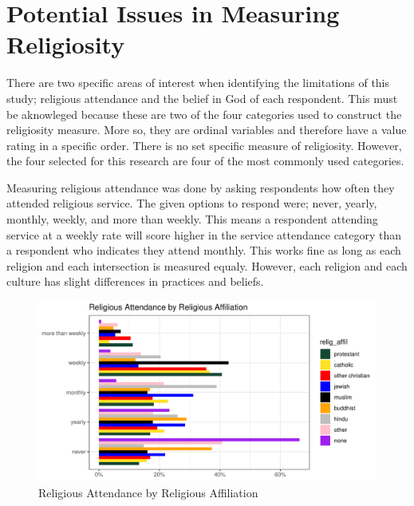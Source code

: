 \documentclass[
  12pt,
  letterpaper,
]{article}
\begin{document}
\hypertarget{potential-issues-in-measuring-religiosity}{%
\section{Potential Issues in Measuring
Religiosity}\label{potential-issues-in-measuring-religiosity}}

There are two specific areas of interest when identifying the
limitations of this study; religious attendance and the belief in God of
each respondent. This must be aknowleged because these are two of the
four categories used to construct the religiosity measure. More so, they
are ordinal variables and therefore have a value rating in a specific
order. There is no set specific measure of religiosity. However, the
four selected for this research are four of the most commonly used
categories.

Measuring religious attendance was done by asking respondents how often
they attended religious service. The given options to respond were;
never, yearly, monthly, weekly, and more than weekly. This means a
respondent attending service at a weekly rate will score higher in the
service attendance category than a respondent who indicates they attend
monthly. This works fine as long as each religion and each intersection
is measured equaly. However, each religion and each culture has slight
differences in practices and beliefs.

\begin{figure}[!t]

{\centering \includegraphics{main_manuscript_files/figure-pdf/fig-Religious_Attendance_by_Religious_Affiliation-1.pdf}

}

\caption{\label{fig-Religious_Attendance_by_Religious_Affiliation}Religious
Attendance by Religious Affiliation}

\end{figure}
\end{document}
